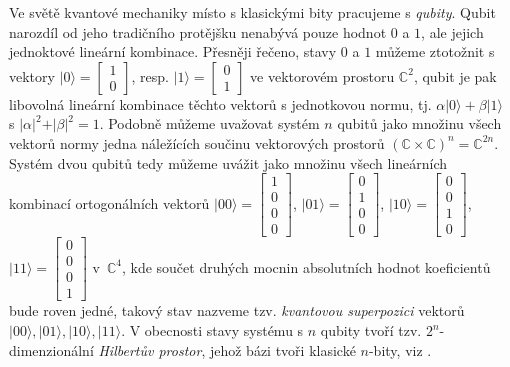 \documentclass[12pt]{report}
\begin{document}
Ve světě kvantové mechaniky místo s klasickými bity pracujeme s \textit{qubity}. Qubit narozdíl od jeho tradičního protějšku nenabývá pouze hodnot $0$ a $1$, ale jejich jednoktové lineární kombinace. Přesněji řečeno, stavy $0$ a $1$ můžeme ztotožnit s vektory $\vert 0 \rangle = \begin{bmatrix}
1\\
0
\end{bmatrix}$, resp. $\vert 1 \rangle = \begin{bmatrix}
0\\
1
\end{bmatrix}$ ve vektorovém prostoru $\mathbb{C}^2$, qubit je pak libovolná lineární kombinace těchto vektorů s jednotkovou normu, tj. $\alpha \vert 0 \rangle + \beta \vert 1 \rangle$ s $\vert \alpha \vert ^2 + \vert \beta \vert ^2 =1$. Podobně můžeme uvažovat systém $n$ qubitů jako množinu všech vektorů normy jedna náležících součinu vektorových prostorů $(\mathbb{C} \times \mathbb{C})^n = \mathbb{C}^{2n}$. Systém dvou qubitů tedy můžeme uvážit jako množinu všech lineárních kombinací ortogonálních vektorů $\vert 00 \rangle = \begin{bmatrix}
1\\
0\\
0\\
0
\end{bmatrix}$, $\vert 01 \rangle = \begin{bmatrix}
0\\
1\\
0\\
0
\end{bmatrix}$, $\vert 10 \rangle = \begin{bmatrix}
0\\
0\\
1\\
0
\end{bmatrix}$, $\vert 11 \rangle = \begin{bmatrix}
0\\
0\\
0\\
1
\end{bmatrix}$ v~$\mathbb{C}^4$, kde součet druhých mocnin absolutních hodnot koeficientů bude roven jedné, takový stav nazveme tzv. \textit{kvantovou superpozici} vektorů $\vert 00 \rangle, \vert 01 \rangle, \vert 10 \rangle, \vert 11 \rangle$. V obecnosti stavy systému s $n$ qubity tvoří tzv. $2^n$-dimenzionální \textit{Hilbertův prostor}, jehož bázi tvoři klasické $n$-bity, viz \cite{Griffiths}.
\end{document}
